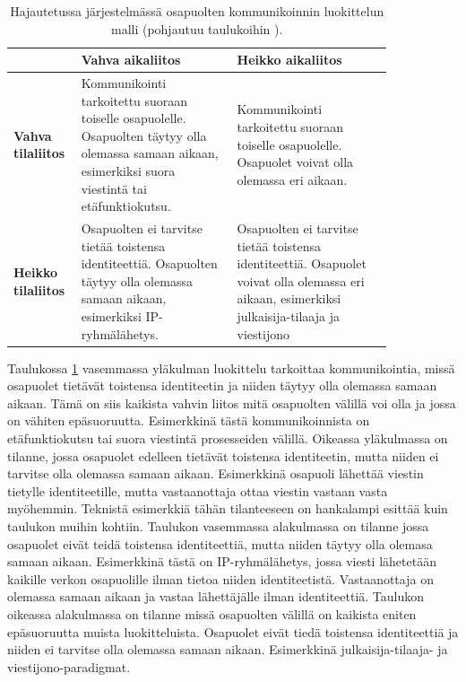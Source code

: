 \begin{table}[ht!]
	\caption{Hajautetussa järjestelmässä osapuolten kommunikoinnin luokittelun malli (pohjautuu taulukoihin \mbox{\cite[s.~231]{distributed-systems-concepts-and-design}} \mbox{\cite[s.~84]{cabri2000mobile}}).}
	\label{tab:communication-models}
	\begin{tabular}{p{0.1\linewidth} | p{0.37\linewidth} | p{0.37\linewidth}}
		\hline
		& \textbf{Vahva aikaliitos} & \textbf{Heikko aikaliitos} \\
		\hline
		\textbf{Vahva tilaliitos} & Kommunikointi tarkoitettu suoraan toiselle osapuolelle. Osapuolten täytyy olla olemassa samaan aikaan, esimerkiksi suora viestintä tai etäfunktiokutsu. & Kommunikointi tarkoitettu suoraan toiselle osapuolelle. Osapuolet voivat olla olemassa eri aikaan.\\
		\hline
		\textbf{Heikko tilaliitos} & Osapuolten ei tarvitse tietää toistensa identiteettiä. Osapuolten täytyy olla olemassa samaan aikaan, esimerkiksi IP-ryhmälähetys. & Osapuolten ei tarvitse tietää toistensa identiteettiä. Osapuolet voivat olla olemassa eri aikaan, esimerkiksi julkaisija-tilaaja ja viestijono \\
		\hline
	\end{tabular}
\end{table}

Taulukossa \ref{tab:communication-models} vasemmassa yläkulman luokittelu tarkoittaa kommunikointia, missä osapuolet tietävät toistensa identiteetin ja niiden täytyy olla olemassa samaan aikaan. Tämä on siis kaikista vahvin liitos mitä osapuolten välillä voi olla ja jossa on vähiten epäsuoruutta. Esimerkkinä tästä kommunikoinnista on etäfunktiokutsu tai suora viestintä prosesseiden välillä. Oikeassa yläkulmassa on tilanne, jossa osapuolet edelleen tietävät toistensa identiteetin, mutta niiden ei tarvitse olla olemassa samaan aikaan. Esimerkkinä osapuoli lähettää viestin tietylle identiteetille, mutta vastaanottaja ottaa viestin vastaan vasta myöhemmin. Teknistä esimerkkiä tähän tilanteeseen on hankalampi esittää kuin taulukon muihin kohtiin. Taulukon vasemmassa alakulmassa on tilanne jossa osapuolet eivät teidä toistensa identiteettiä, mutta niiden täytyy olla olemasa samaan aikaan. Esimerkkinä tästä on IP-ryhmälähetys, jossa viesti lähetetään kaikille verkon osapuolille ilman tietoa niiden identiteetistä. Vastaanottaja on olemassa samaan aikaan ja vastaa lähettäjälle ilman identiteettiä. Taulukon oikeassa alakulmassa on tilanne missä osapuolten välillä on kaikista eniten epäsuoruutta muista luokitteluista. Osapuolet eivät tiedä toistensa identiteettiä ja niiden ei tarvitse olla olemassa samaan aikaan. Esimerkkinä julkaisija-tilaaja- ja viestijono-paradigmat. \mbox{\cite[s.~230--232]{distributed-systems-concepts-and-design}} \mbox{\cite{cabri2000mobile}}

